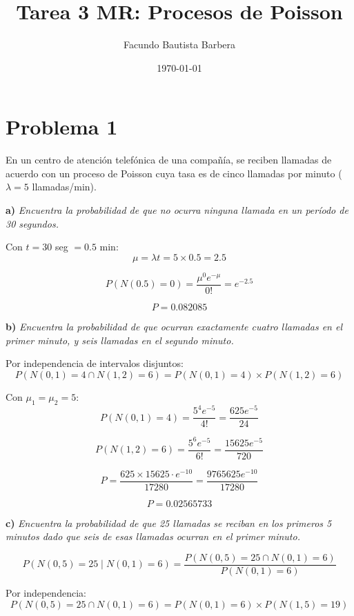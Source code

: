 \documentclass{article}
\title{Tarea 3 MR: Procesos de Poisson}
\author{Facundo Bautista Barbera}
\date{\today}
\begin{document}
\maketitle

\section*{Problema 1}

En un centro de atención telefónica de una compañía, se reciben llamadas de acuerdo con un proceso de Poisson cuya tasa es de cinco llamadas por minuto ($\lambda = 5$ llamadas/min).

\textbf{a)} \textit{Encuentra la probabilidad de que no ocurra ninguna llamada en un período de 30 segundos.}

\vspace{0.3cm}
Con $t = 30$ seg $= 0.5$ min:
$$\mu = \lambda t = 5 \times 0.5 = 2.5$$

$$P(N(0.5) = 0) = \frac{\mu^0 e^{-\mu}}{0!} = e^{-2.5}$$

$$\boxed{P = 0.082085}$$

\vspace{0.5cm}
\textbf{b)}
\textit{Encuentra la probabilidad de que ocurran exactamente cuatro llamadas en el primer minuto, y seis llamadas en el segundo minuto.}

\vspace{0.3cm}
Por independencia de intervalos disjuntos:
$$P(N(0,1) = 4 \cap N(1,2) = 6) = P(N(0,1) = 4) \times P(N(1,2) = 6)$$

Con $\mu_1 = \mu_2 = 5$:
$$P(N(0,1) = 4) = \frac{5^4 e^{-5}}{4!} = \frac{625 e^{-5}}{24}$$

$$P(N(1,2) = 6) = \frac{5^6 e^{-5}}{6!} = \frac{15625 e^{-5}}{720}$$

$$P = \frac{625 \times 15625 \cdot e^{-10}}{17280} = \frac{9765625 e^{-10}}{17280}$$

$$\boxed{P = 0.02565733}$$

\vspace{0.5cm}
\textbf{c)} \textit{Encuentra la probabilidad de que 25 llamadas se reciban en los primeros 5 minutos dado que seis de esas llamadas ocurran en el primer minuto.}

\vspace{0.3cm}
$$P(N(0,5) = 25 \mid N(0,1) = 6) = \frac{P(N(0,5) = 25 \cap N(0,1) = 6)}{P(N(0,1) = 6)}$$

Por independencia:
$$P(N(0,5) = 25 \cap N(0,1) = 6) = P(N(0,1) = 6) \times P(N(1,5) = 19)$$
\end{document}
